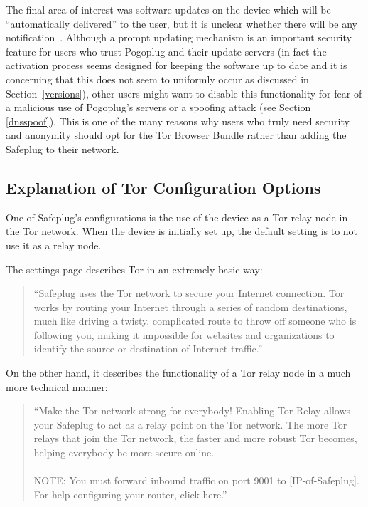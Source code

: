 \documentclass[conference]{IEEEtran}
\begin{document}
The final area of interest was software updates on the device which will be ``automatically delivered'' to the user, but it is unclear whether there will be any notification~\cite{safeplug}.  Although a prompt updating mechanism is an important security feature for users who trust Pogoplug and their update servers (in fact the activation process seems designed for keeping the software up to date and it is concerning that this does not seem to uniformly occur as discussed in Section~\ref{versions}), other users might want to disable this functionality for fear of a malicious use of Pogoplug's servers or a spoofing attack (see Section \ref{dnsspoof}).  This is one of the many reasons why users who truly need security and anonymity should opt for the Tor Browser Bundle rather than adding the Safeplug to their network.

\subsection{Explanation of Tor Configuration Options}
\label{port9001}
One of Safeplug's configurations is the use of the device as a Tor relay node in the Tor network.  When the device is initially set up, the default setting is to not use it as a relay node.  

The settings page describes Tor in an extremely basic way:

\begin{quotation}
``Safeplug uses the Tor network to secure your Internet connection.  Tor works by routing your Internet through a series of random destinations, much like driving a twisty, complicated route to throw off someone who is following you, making it impossible for websites and organizations to identify the source or destination of Internet traffic.'' \cite{safeplug}
\end{quotation}

On the other hand, it describes the functionality of a Tor relay node in a much more technical manner:
\begin{quotation}
``Make the Tor network strong for everybody! Enabling Tor Relay allows your Safeplug to act as a relay point on the Tor network. The more Tor relays that join the Tor network, the faster and more robust Tor becomes, helping everybody be more secure online. \\ \\ NOTE: You must forward inbound traffic on port 9001 to [IP-of-Safeplug]. \\ For help configuring your router, click here.''
\cite{safeplug}
\end{quotation}
\end{document}

